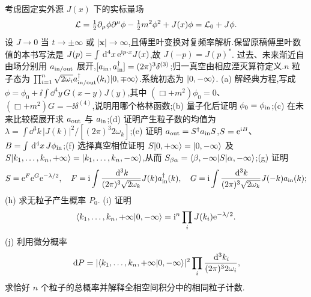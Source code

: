 \begin{exercise}
考虑固定实外源 $J(x)$ 下的实标量场
\[
\mathcal L=\tfrac12\partial_\mu\phi\partial^\mu\phi-\tfrac12m^2\phi^2+J(x)\phi=\mathcal L_0+J\phi.
\]
设 $J\to0$ 当 $t\to\pm\infty$ 或 $|\mathbf x|\to\infty$,且傅里叶变换对复频率解析.保留原稿傅里叶数值的本书写法是 $J(p)=\int\,\mathrm d^4x\,\mathrm e^{\mathrm i p\cdot x}J(x)$,故 $J(-p)=J(p)^*$.
过去、未来渐近自由场分别用 $a_{\rm in/out}$ 展开,$[a_{\rm in},a_{\rm in}^\dagger]=(2\pi)^3\delta^{(3)}$;归一真空由相应湮灭算符定义.$n$ 粒子态为 $\prod_{i=1}^n\sqrt{2\omega_i}a_{\rm in/out}^\dagger(k_i)\lvert 0,\mp\infty\rangle$.系统初态为 $\lvert 0,-\infty\rangle$.
(a) 解经典方程,写成 $\phi=\phi_0+\ii\int\dd^4y\,G(x-y)J(y)$,其中 $(\Box+m^2)\phi_0=0$、$(\Box+m^2)G=-\ii\delta^{(4)}$,说明用哪个格林函数;(b) 量子化后证明 $\phi_0=\phi_{\rm in}$;(c) 在未来比较模展开求 $a_{\rm out}$ 与 $a_{\rm in}$;(d) 证明产生粒子数的均值为 $\lambda=\int\dd^3k\,|J(k)|^2/[(2\pi)^3 2\omega_k]$;(e) 证明 $a_{\rm out}=S^\dagger a_{\rm in}S$,$S=\mathrm e^{\mathrm i B}$、$B=\int\,\mathrm d^4x\,J\phi_{\rm in}$;(f) 选择真空相位证明 $S\lvert 0,+\infty\rangle=\lvert 0,-\infty\rangle$ 及 $S\lvert k_1,\ldots,k_n,+\infty\rangle=\lvert k_1,\ldots,k_n,-\infty\rangle$,从而 $S_{\beta\alpha}=\langle \beta,-\infty\rvert S\lvert \alpha,-\infty\rangle$;(g) 证明
\[
S=\mathrm e^F\mathrm e^G\mathrm e^{-\lambda/2},\quad
F=\mathrm i\int\frac{\,\mathrm d^3k}{(2\pi)^3\sqrt{2\omega_k}}J(k)a_{\rm in}^\dagger(k),\quad
G=\mathrm i\int\frac{\,\mathrm d^3k}{(2\pi)^3\sqrt{2\omega_k}}J(-k)a_{\rm in}(k);
\]
(h) 求无粒子产生概率 $P_0$. (i) 证明
\[
\langle k_1,\ldots,k_n,+\infty\rvert0,-\infty\rangle
=\mathrm i^n\prod_iJ(k_i)\mathrm e^{-\lambda/2}.
\]
(j) 利用微分概率
\[
\,\mathrm d P=|\langle k_1,\ldots,k_n,+\infty\rvert0,-\infty\rangle|^2
\prod_i\frac{\,\mathrm d^3k_i}{(2\pi)^3 2\omega_i},
\]
求恰好 $n$ 个粒子的总概率并解释全相空间积分中的相同粒子计数.
\end{exercise}
